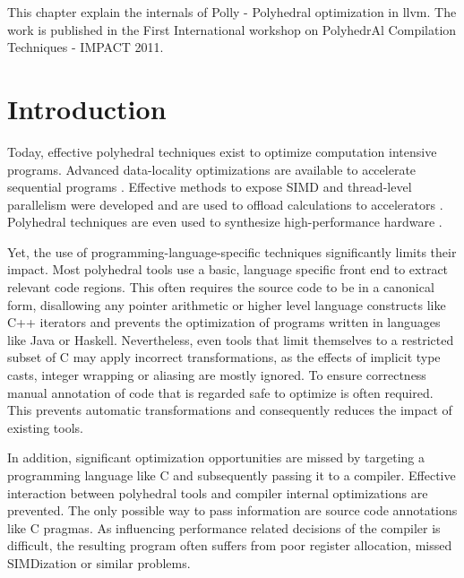 \label{chap:polly}

This chapter explain the internals of  Polly - Polyhedral optimization
in llvm. The work is published in the First International workshop on PolyhedrAl Compilation
Techniques - IMPACT 2011\cite{pollypaper}.

\section{Introduction}

Today, effective polyhedral techniques exist to optimize computation intensive
programs.  Advanced data-locality optimizations are available to accelerate
sequential programs \cite{uday08pldi}. Effective methods to expose SIMD and
thread-level parallelism were developed and are used to offload calculations to
accelerators \cite{Baskaran10, Baghdadi_puttingautomatic}.  Polyhedral
techniques are even used to synthesize high-performance hardware
\cite{RISSET:2008}.

Yet, the use of programming-language-specific techniques significantly limits
their impact.  Most polyhedral tools use a basic, language specific front end
to extract relevant code regions. This often requires the source code to be in
a canonical form, disallowing any pointer arithmetic or higher level
language constructs like C++ iterators and prevents the optimization of
programs written in languages like Java or Haskell. Nevertheless, even tools
that limit themselves to a restricted subset of C may apply incorrect
transformations, as the effects of implicit type casts, integer wrapping or
aliasing are mostly ignored. To ensure correctness manual annotation
of code that is regarded safe to optimize is often required.  This prevents
automatic transformations and consequently reduces the impact of existing
tools.

In addition, significant optimization opportunities are missed by targeting a
programming language like C and subsequently passing it to a compiler. 
Effective interaction between polyhedral tools and
compiler internal optimizations are prevented. The only possible
way to pass information are source code annotations like C pragmas. As influencing
performance related decisions of the compiler is difficult, the resulting
program often suffers from poor register allocation, missed SIMDization or
similar problems.

